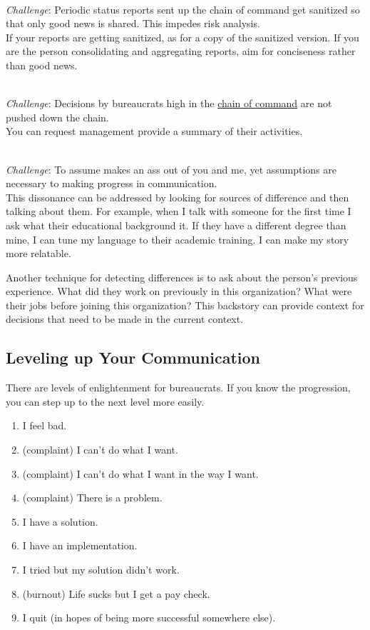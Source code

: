 \ \\
\textit{Challenge}: Periodic status reports sent up the chain of command get sanitized so that only good news is shared. This impedes risk analysis. \\
If your reports are getting sanitized, as for a copy of the sanitized version. If you are the person consolidating and aggregating reports, aim for conciseness rather than good news. 

\ \\
\textit{Challenge}: Decisions by bureaucrats high in the \href{https://en.wikipedia.org/wiki/Command_hierarchy}{chain of command}
are not pushed down the chain. \\
You can request management provide a summary of their activities.

\ \\
\textit{Challenge}: To assume makes an ass out of you and me, 
yet assumptions are necessary to making progress in communication.\\ 
This dissonance can be addressed by looking for sources of difference and then talking about them. For example, when I talk with someone for the first time I ask what their educational background it. If they have a different degree than mine, I can tune my language to their academic training. I can make my story more relatable. 

Another technique for detecting differences is to ask about the person's previous experience. What did they work on previously in this organization? What were their jobs before joining this organization? This backstory can provide context for decisions that need to be made in the current context. 

\subsection*{Leveling up Your Communication}

There are levels of enlightenment for bureaucrats. If you know the progression, you can step up to the next level more easily.
\begin{enumerate}
    \item I feel bad.
    \item (complaint) I can't do what I want.
    \item (complaint) I can't do what I want in the way I want.
    \item (complaint) There is a problem.
    \item I have a solution.
    \item I have an implementation.
    \item I tried but my solution didn't work.
    \item (burnout) Life sucks but I get a pay check.
    \item I quit (in hopes of being more successful somewhere else).
\end{enumerate}


